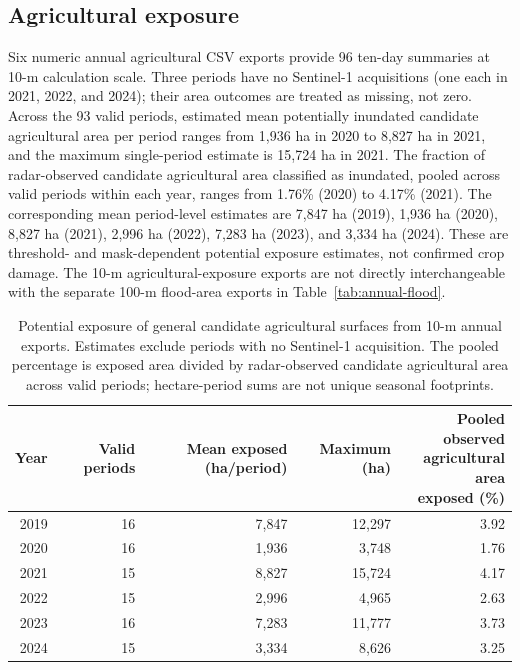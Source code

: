 \documentclass[pdflatex,sn-mathphys,Numbered]{sn-jnl}
\begin{document}
\subsection{Agricultural exposure}
Six numeric annual agricultural CSV exports provide 96 ten-day summaries at 10-m calculation scale. Three periods have no Sentinel-1 acquisitions (one each in 2021, 2022, and 2024); their area outcomes are treated as missing, not zero. Across the 93 valid periods, estimated mean potentially inundated candidate agricultural area per period ranges from 1,936 ha in 2020 to 8,827 ha in 2021, and the maximum single-period estimate is 15,724 ha in 2021. The fraction of radar-observed candidate agricultural area classified as inundated, pooled across valid periods within each year, ranges from 1.76\% (2020) to 4.17\% (2021). The corresponding mean period-level estimates are 7,847 ha (2019), 1,936 ha (2020), 8,827 ha (2021), 2,996 ha (2022), 7,283 ha (2023), and 3,334 ha (2024). These are threshold- and mask-dependent potential exposure estimates, not confirmed crop damage. The 10-m agricultural-exposure exports are not directly interchangeable with the separate 100-m flood-area exports in Table~\ref{tab:annual-flood}.

\begin{table}[t]
\centering
\caption{Potential exposure of general candidate agricultural surfaces from 10-m annual exports. Estimates exclude periods with no Sentinel-1 acquisition. The pooled percentage is exposed area divided by radar-observed candidate agricultural area across valid periods; hectare-period sums are not unique seasonal footprints.}
\label{tab:crop-exposure}
\small
\begin{tabular}{rrrrr}
\toprule
Year & Valid periods & Mean exposed (ha/period) & Maximum (ha) & \makecell{Pooled observed\\agricultural area\\exposed (\%)}\\
\midrule
2019 & 16 & 7,847 & 12,297 & 3.92 \\
2020 & 16 & 1,936 & 3,748 & 1.76 \\
2021 & 15 & 8,827 & 15,724 & 4.17 \\
2022 & 15 & 2,996 & 4,965 & 2.63 \\
2023 & 16 & 7,283 & 11,777 & 3.73 \\
2024 & 15 & 3,334 & 8,626 & 3.25 \\
\bottomrule
\end{tabular}
\end{table}
\end{document}
